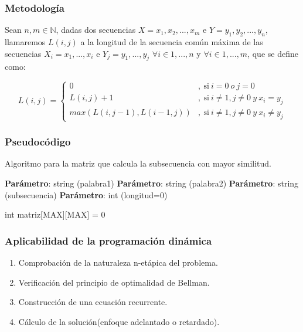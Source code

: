 \documentclass[13pt]{beamer}
\begin{document}
    \begin{frame}
        \frametitle{Metodología}
        Sean $n,m \in \mathbb{N}$, dadas dos secuencias $X = { x_1,x_2,...,x_m}$ e $Y = { y_1,y_2,...,y_n}$, llamaremos $L(i,j)$ a la 
        longitud de la secuencia común máxima de las secuencias $X_i = {x_1,...,x_i}$ e $Y_j = {y_1,...,y_j}$ $\forall i \in {1,...,n} $ y $\forall i \in {1,...,m}$, 
        que se define como:  

        \[
        L(i,j) = 
        \left \{
            \begin{aligned}
            0 &,\ \text{si} \ i = 0 \ o \ j = 0\\
            L(i,j) + 1 &,\ \text{si} \ i \neq  1 , j \neq  0 \ y \ x_i = y_j\\
            max(L(i,j-1) , L(i-1,j))&,\ \text{si} \ i \neq 1 , j \neq 0 \ y \ x_i \neq y_j
            \end{aligned}
        \right .
        \]
    \end{frame}



    \begin{frame}
        \frametitle{Pseudocódigo}
    
        \begin{algorithm}[H]
            \caption{Algoritmo para la matriz que calcula la subsecuencia con mayor similitud.}\label{alg:simil}
            \begin{minipage}{0.92\textwidth}
            \textbf{Parámetro}: string (palabra1)
            \textbf{Parámetro}: string (palabra2)
            \textbf{Parámetro}: string (subsecuencia)
            \textbf{Parámetro}: int (longitud=0)
            \end{minipage}

            int matriz[MAX][MAX] = {0}

             {
                 {
                }
            }
        \end{algorithm}
    \end{frame}

    \begin{frame}
		\frametitle{Aplicabilidad de la programación dinámica}
        \begin{enumerate}
            \item Comprobación de la naturaleza n-etápica del problema. 
            \item Verificación del principio de optimalidad de Bellman. 
            \item Construcción de una ecuación recurrente. 
            \item Cálculo de la solución(enfoque adelantado o retardado). 
        \end{enumerate}
	\end{frame}
\end{document}

